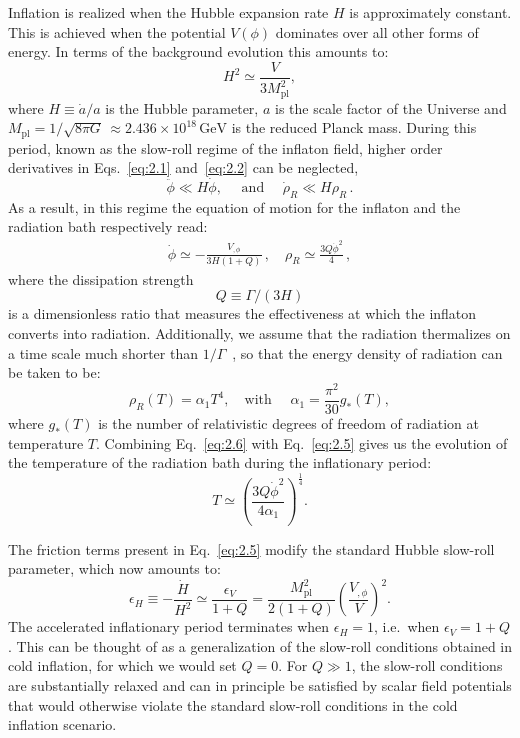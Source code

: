 \documentclass[aps,prd,twocolumn,amssymb,amsmath,floatfix,nofootinbib,superscriptaddress,preprintnumbers]{revtex4-1}
\begin{document}
Inflation is realized when the Hubble expansion rate $H$ is approximately constant. This is achieved when the potential $V(\phi)$ dominates over all other forms of energy. In terms of the background evolution this amounts to:
\begin{equation}
    H^2\simeq \frac{V}{3M_{\mathrm{pl}}^2}, \label{eq:2.3}
\end{equation}
where $H\equiv \dot{a}/a$ is the Hubble parameter, $a$ is the scale factor of the Universe and $M_{\mathrm{pl}}= 1/\sqrt{8 \pi G} \, \approx 2.436\times 10^{18}\,\mathrm{GeV}$ is the reduced Planck mass. During this period, known as the slow-roll regime of the inflaton field, higher order derivatives in Eqs.~\ref{eq:2.1} and~\ref{eq:2.2} can be neglected,
\begin{equation}
    \ddot{\phi} \ll H \dot{\phi}, \quad \text { and } \quad \dot{\rho}_{R} \ll H \rho_{R}\,. \label{eq:2.4}
\end{equation}
As a result, in this regime the equation of motion for the inflaton and the radiation bath respectively read:
\begin{align}
 \Dot{\phi}\simeq -\frac{V_{,\phi}}{3H(1+Q)}\,, \quad \rho_R\simeq \frac{3Q \Dot{\phi}^2}{4}\,, \label{eq:2.5}
\end{align}
where the dissipation strength 
\begin{equation}
Q\equiv \Gamma/(3H)
\end{equation}
is a dimensionless ratio that measures the effectiveness at which the inflaton converts into radiation. Additionally, we assume that the radiation thermalizes on a time scale much shorter than $1/\Gamma$~\cite{Berera:1995ie, Berera:1995wh}, so that the energy density of radiation can be taken to be:
\begin{equation}
    \rho_R(T)=\alpha_1 T^4, \quad \text{with } \quad \alpha_1=\frac{\pi^2}{30}g_{*}(T), \label{eq:2.6}
\end{equation}
where $g_{*}(T)$ is the number of relativistic degrees of freedom of radiation at temperature $T$. Combining Eq.~\ref{eq:2.6} with Eq.~\ref{eq:2.5} gives us the evolution of the temperature of the radiation bath during the inflationary period:
\begin{equation}
    T\simeq \left( \frac{3Q \Dot{\phi}^2}{4\alpha_1}\right)^\frac{1}{4}.
    \label{eq:2.1.8}
\end{equation}

The friction terms present in Eq.~\ref{eq:2.5} modify the standard Hubble slow-roll parameter, which now amounts to:
\begin{equation}
    \epsilon_H\equiv -\frac{\dot{H}}{H^2}\simeq \frac{\epsilon_V}{1+Q}= \frac{M_{\mathrm{pl}}^{2}}{2(1+Q)}\left(\frac{V_{, \phi}}{V}\right)^{2}.
\end{equation}
The accelerated inflationary period terminates when $\epsilon_H = 1$, i.e.\ when $\epsilon_V = 1 + Q$. This can be thought of as a generalization of the slow-roll conditions obtained in cold inflation, for which we would set $Q=0$. For $Q\gg 1$, the slow-roll conditions are substantially relaxed and can in principle be satisfied by scalar field potentials that would otherwise violate the standard slow-roll conditions in the cold inflation scenario.
\end{document}
